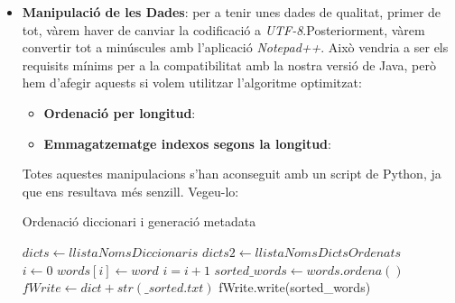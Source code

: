 \documentclass[conference]{IEEEtran}
\begin{document}
        \begin{itemize}
            \item \textbf{Manipulació de les Dades}: per a tenir unes dades de qualitat, primer de tot, vàrem haver de canviar la codificació a \textit{UTF-8}.Posteriorment, vàrem convertir tot a minúscules amb l'aplicació \textit{Notepad++}. Això vendria a ser els requisits mínims per a la compatibilitat amb la nostra versió de Java, però hem d'afegir aquests si volem utilitzar l'algoritme optimitzat:

            \begin{itemize}
                \item \textbf{Ordenació per longitud}:

                \item \textbf{Emmagatzematge indexos segons la longitud}:
            \end{itemize}

            Totes aquestes manipulacions s'han aconseguit amb un script de Python, ja que ens resultava més senzill. Vegeu-lo:\\

                \begin{algorithm}
                    \caption{Ordenació diccionari i generació metadata}
                    \begin{algorithmic}[1]
                        \State $dicts  \gets llistaNomsDiccionaris$
                        \State $dicts2 \gets llistaNomsDictsOrdenats$\\

                                \State $i\gets 0$
                                    \State $words[i]\gets word$
                                    \State $i=i+1$
                                \EndFor
                                \State $sorted\_words \gets words.ordena()$
                                \State $fWrite \gets dict+str(\_sorted.txt)$
                                \State fWrite.write(sorted\_words)
                    \EndFor\\\\


\end{algorithmic}
\end{algorithm}
\end{itemize}
\end{document}
